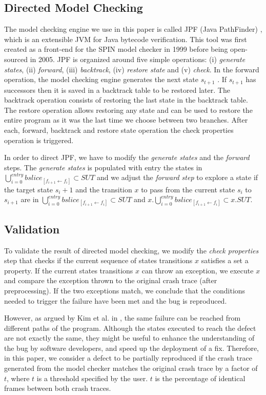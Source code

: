 \documentclass[times]{smrauth}
\begin{document}
\subsection{Directed Model Checking}

The model checking engine we use in this paper is called JPF
(Java PathFinder) \cite{Visser2004}, which is an extensible JVM for Java
bytecode verification. This tool was first created as a front-end
for the SPIN model checker \cite{holzmann1997model} in 1999 before being open-
sourced in 2005. JPF is organized around five simple
operations: (i) {\it generate states}, (ii) {\it forward}, (iii) {\it backtrack},
(iv) {\it restore state} and (v) {\it check}. In the forward operation, the
model checking engine generates the next state $s_{t+1}$ . If
$s_{t+1}$ has successors then it is saved in a backtrack table to be
restored later. The backtrack operation consists of restoring
the last state in the backtrack table. The restore operation
allows restoring any state and can be used to restore the entire
program as it was the last time we choose between two
branches. After each, forward, backtrack and restore state
operation the check properties operation is triggered.

In order to direct JPF, we have to modify the {\it generate states}
and the {\it forward} steps. The {\it generate states} is populated with
entry
the states in $\bigcup_{i=0}^{entry} bslice_{[f_{i+1} \leftarrow f_i]}  \subset SUT$ and we adjust the
{\it forward step} to explore a state if the target state $s_i+1$ and the
transition $x$ to pass from the current state $s_i$ to $s_{i+1}$ are in
$\bigcup_{i=0}^{entry} bslice_{[f_{i+1} \leftarrow f_i]}  \subset SUT$ and $x.\bigcup_{i=0}^{entry} bslice_{[f_{i+1} \leftarrow f_i]}  \subset x.SUT$.

\subsection{Validation}

To validate the result of directed model checking, we modify
the {\it check properties} step that checks if the current sequence
of states transitions $x$ satisfies a set a property. If the current
states transitions $x$ can throw an exception, we execute $x$ and
compare the exception thrown to the original crash trace (after
preprocessing). If the two exceptions match, we conclude that
the conditions needed to trigger the failure have been met and
the bug is reproduced.

However, as argued by Kim et al. in \cite{Kim2013b}, the same failure can
be reached from different paths of the program. Although the
states executed to reach the defect are not exactly the same,
they might be useful to enhance the understanding of the bug
by software developers, and speed up the deployment of a fix.
Therefore, in this paper, we consider a defect to be partially
reproduced if the crash trace generated from the model
checker matches the original crash trace by a factor of $t$, where
$t$ is a threshold specified by the user. $t$ is the percentage of
identical frames between both crash traces.
\end{document}
